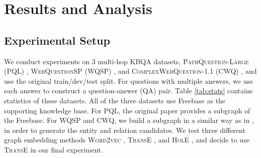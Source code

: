 \section{Results and Analysis}

\subsection{Experimental Setup}
We conduct experiments on 3 multi-hop KBQA datasets, \textsc{PathQuestion-Large} (PQL) \cite{DBLP:conf/coling/ZhouHZ18}, \textsc{WebQuestionSP} (WQSP) \cite{DBLP:conf/acl/YihCHG15}, and \textsc{ComplexWebQuestion}-1.1 (CWQ) \cite{DBLP:journals/corr/abs-1807-09623}, and use the original train/dev/test split. For questions with multiple answers, we use each answer to construct a question-answer (QA) pair. Table \ref{tab:stats} contains statistics of these datasets. All of the three datasets use Freebase as the supporting knowledge base. For PQL, the original paper provides a subgraph of the Freebase. For WQSP and CWQ, we build a subgraph in a similar way as in \cite{DBLP:conf/emnlp/SunDZMSC18}, in order to generate the entity and relation candidates. We test three different graph embedding methods \textsc{Word2vec} \cite{DBLP:journals/corr/abs-1301-3781}, \textsc{TransE} \cite{DBLP:conf/nips/BordesUGWY13}, and \textsc{HolE} \cite{DBLP:journals/corr/TrouillonN17}, and decide to use \textsc{TransE} in our final experiment. 

\begin{table}[h]\centering
{}
\caption{\fontsize{10}{12}\selectfont Statistics of the datasets. %
}\label{tab:stats}
\end{table}

